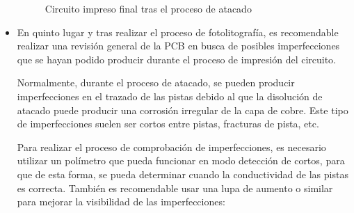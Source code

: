 \begin{itemize}
    \begin{figure}[H]
    \centering
    \caption{Circuito impreso final tras el proceso de atacado}
    \label{fig:lego}
    \end{figure}
    
    \item En quinto lugar y tras realizar el proceso de fotolitografía, es recomendable realizar una revisión general de la PCB en busca de posibles imperfecciones que se hayan podido producir durante el proceso de impresión del circuito.
    
    Normalmente, durante el proceso de atacado, se pueden producir imperfecciones en el trazado de las pistas debido al que la disolución de atacado puede producir una corrosión irregular de la capa de cobre. Este tipo de imperfecciones suelen ser cortos entre pistas, fracturas de pista, etc.
    
    Para realizar el proceso de comprobación de imperfecciones, es necesario utilizar un polímetro que pueda funcionar en modo detección de cortos, para que de esta forma, se pueda determinar cuando la conductividad de las pistas es correcta. También es recomendable usar una lupa de aumento o similar para mejorar la visibilidad de las imperfecciones:
    

\end{itemize}
